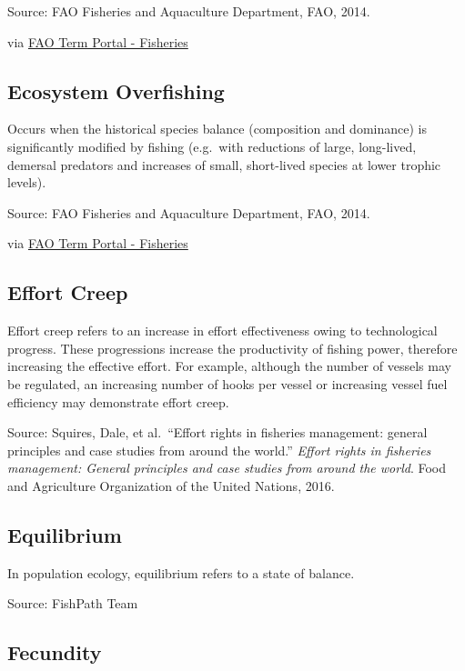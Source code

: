 \documentclass[
  11pt,
]{book}
\begin{document}
Source: FAO Fisheries and Aquaculture Department, FAO, 2014.

via \href{http://www.fao.org/fishery/glossary/en}{FAO Term Portal - Fisheries}

\hypertarget{ecosystem-overfishing}{%
\subsection{Ecosystem Overfishing}\label{ecosystem-overfishing}}

Occurs when the historical species balance (composition and dominance) is significantly modified by fishing (e.g.~with reductions of large, long-lived, demersal predators and increases of small, short-lived species at lower trophic levels).

Source: FAO Fisheries and Aquaculture Department, FAO, 2014.

via \href{http://www.fao.org/fishery/glossary/en}{FAO Term Portal - Fisheries}

\hypertarget{effort-creep}{%
\subsection{Effort Creep}\label{effort-creep}}

Effort creep refers to an increase in effort effectiveness owing to technological progress. These progressions increase the productivity of fishing power, therefore increasing the effective effort. For example, although the number of vessels may be regulated, an increasing number of hooks per vessel or increasing vessel fuel efficiency may demonstrate effort creep.

Source: Squires, Dale, et al.~``Effort rights in fisheries management: general principles and case studies from around the world.'' \emph{Effort rights in fisheries management: General principles and case studies from around the world}. Food and Agriculture Organization of the United Nations, 2016.

\hypertarget{equilibrium}{%
\subsection{Equilibrium}\label{equilibrium}}

In population ecology, equilibrium refers to a state of balance.

Source: FishPath Team

\hypertarget{fecundity}{%
\subsection{Fecundity}\label{fecundity}}
\end{document}
